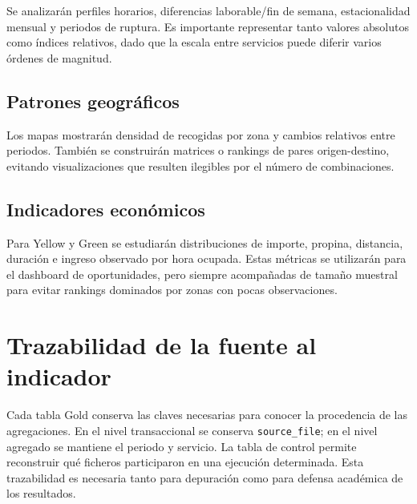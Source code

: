 Se analizarán perfiles horarios, diferencias laborable/fin de semana, estacionalidad mensual y periodos de ruptura. Es importante representar tanto valores absolutos como índices relativos, dado que la escala entre servicios puede diferir varios órdenes de magnitud.

\subsection{Patrones geográficos}

Los mapas mostrarán densidad de recogidas por zona y cambios relativos entre periodos. También se construirán matrices o rankings de pares origen-destino, evitando visualizaciones que resulten ilegibles por el número de combinaciones.

\subsection{Indicadores económicos}

Para Yellow y Green se estudiarán distribuciones de importe, propina, distancia, duración e ingreso observado por hora ocupada. Estas métricas se utilizarán para el dashboard de oportunidades, pero siempre acompañadas de tamaño muestral para evitar rankings dominados por zonas con pocas observaciones.

\section{Trazabilidad de la fuente al indicador}

Cada tabla Gold conserva las claves necesarias para conocer la procedencia de las agregaciones. En el nivel transaccional se conserva \texttt{source\_file}; en el nivel agregado se mantiene el periodo y servicio. La tabla de control permite reconstruir qué ficheros participaron en una ejecución determinada. Esta trazabilidad es necesaria tanto para depuración como para defensa académica de los resultados.
